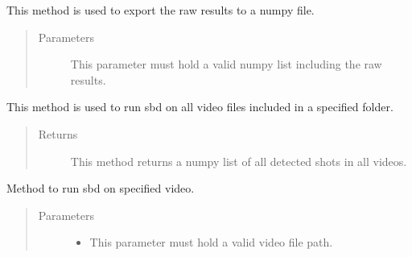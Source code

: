 \documentclass[letterpaper,10pt,english,openany,oneside]{sphinxmanual}
\begin{document}
\begin{fulllineitems}
\begin{fulllineitems}
\label{\detokenize{SBD:sbd.SBD.SBD.exportRawResultsAsNumpy}}
This method is used to export the raw results to a numpy file.
\begin{quote}\begin{description}
\item[{Parameters}] \leavevmode
{} \textendash{} This parameter must hold a valid numpy list including the raw results.

\end{description}\end{quote}

\end{fulllineitems}


\begin{fulllineitems}
\label{\detokenize{SBD:sbd.SBD.SBD.runOnFolder}}
This method is used to run sbd on all video files included in a specified folder.
\begin{quote}\begin{description}
\item[{Returns}] \leavevmode
This method returns a numpy list of all detected shots in all videos.

\end{description}\end{quote}

\end{fulllineitems}


\begin{fulllineitems}
\label{\detokenize{SBD:sbd.SBD.SBD.runOnSingleVideo}}
Method to run sbd on specified video.
\begin{quote}\begin{description}
\item[{Parameters}] \leavevmode\begin{itemize}
\item {} 
 \textendash{} This parameter must hold a valid video file path.


\end{itemize}
\end{description}
\end{quote}
\end{fulllineitems}
\end{fulllineitems}
\end{document}
